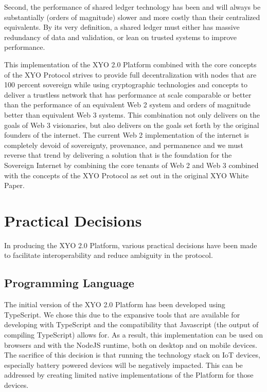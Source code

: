 \documentclass{article}
\begin{document}
Second, the performance of shared ledger technology has been and will always be substantially (orders of magnitude) slower and more costly than their centralized equivalents.  By its very definition, a shared ledger must either has massive redundancy of data and validation, or lean on trusted systems to improve performance.

This implementation of the XYO 2.0 Platform combined with the core concepts of the XYO Protocol strives to provide full decentralization with nodes that are 100 percent sovereign while using cryptographic technologies and concepts to deliver a trustless network that has performance at scale comparable or better than the performance of an equivalent Web 2 system and orders of magnitude better than equivalent Web 3 systems.  This combination not only delivers on the goals of Web 3 visionaries, but also delivers on the goals set forth by the original founders of the internet. The current Web 2 implementation of the internet is completely devoid of sovereignty, provenance, and permanence and we must reverse that trend by delivering a solution that is the foundation for the Sovereign Internet by combining the core tenants of Web 2 and Web 3 combined with the concepts of the XYO Protocol as set out in the original XYO White Paper.

\clearpage
\section{Practical Decisions}
In producing the XYO 2.0 Platform, various practical decisions have been made to facilitate interoperability and reduce ambiguity in the protocol.

\subsection{Programming Language}
The initial version of the XYO 2.0 Platform has been developed using TypeScript.  We chose this due to the expansive tools that are available for developing with TypeScript and the compatibility that Javascript (the output of compiling TypeScript) allows for.  As a result, this implementation can be used on browsers and with the NodeJS runtime, both on desktop and on mobile devices.  The sacrifice of this decision is that running the technology stack on IoT devices, especially battery powered devices will be negatively impacted.  This can be addressed by creating limited native implementations of the Platform for those devices.
\end{document}
